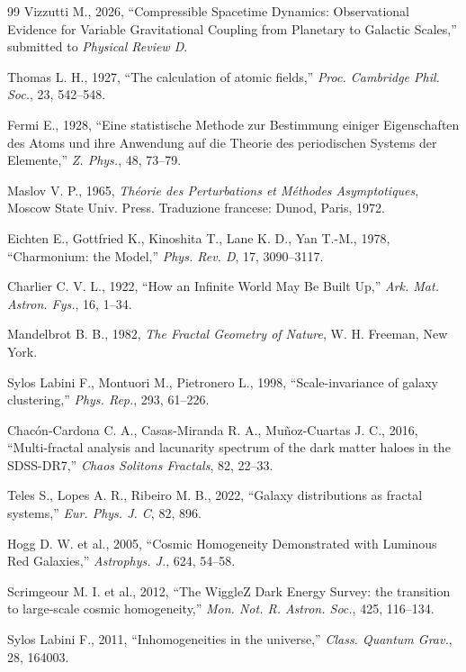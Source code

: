\documentclass[10pt,a4paper]{article}
\begin{document}
\begin{thebibliography}{99}
Vizzutti M., 2026, ``Compressible Spacetime Dynamics: Observational Evidence for Variable Gravitational Coupling from Planetary to Galactic Scales,'' submitted to \emph{Physical Review D}.


Thomas L. H., 1927, ``The calculation of atomic fields,'' \emph{Proc. Cambridge Phil. Soc.}, 23, 542--548.


Fermi E., 1928, ``Eine statistische Methode zur Bestimmung einiger Eigenschaften des Atoms und ihre Anwendung auf die Theorie des periodischen Systems der Elemente,'' \emph{Z. Phys.}, 48, 73--79.


Maslov V. P., 1965, \emph{Th\'eorie des Perturbations et M\'ethodes Asymptotiques}, Moscow State Univ. Press. Traduzione francese: Dunod, Paris, 1972.


Eichten E., Gottfried K., Kinoshita T., Lane K. D., Yan T.-M., 1978, ``Charmonium: the Model,'' \emph{Phys. Rev. D}, 17, 3090--3117.


Charlier C. V. L., 1922, ``How an Infinite World May Be Built Up,'' \emph{Ark. Mat. Astron. Fys.}, 16, 1--34.


Mandelbrot B. B., 1982, \emph{The Fractal Geometry of Nature}, W. H. Freeman, New York.


Sylos Labini F., Montuori M., Pietronero L., 1998, ``Scale-invariance of galaxy clustering,'' \emph{Phys. Rep.}, 293, 61--226.


Chac\'on-Cardona C. A., Casas-Miranda R. A., Mu\~noz-Cuartas J. C., 2016, ``Multi-fractal analysis and lacunarity spectrum of the dark matter haloes in the SDSS-DR7,'' \emph{Chaos Solitons Fractals}, 82, 22--33.


Teles S., Lopes A. R., Ribeiro M. B., 2022, ``Galaxy distributions as fractal systems,'' \emph{Eur. Phys. J. C}, 82, 896.


Hogg D. W. et al., 2005, ``Cosmic Homogeneity Demonstrated with Luminous Red Galaxies,'' \emph{Astrophys. J.}, 624, 54--58.


Scrimgeour M. I. et al., 2012, ``The WiggleZ Dark Energy Survey: the transition to large-scale cosmic homogeneity,'' \emph{Mon. Not. R. Astron. Soc.}, 425, 116--134.


Sylos Labini F., 2011, ``Inhomogeneities in the universe,'' \emph{Class. Quantum Grav.}, 28, 164003.



\end{thebibliography}
\end{document}
